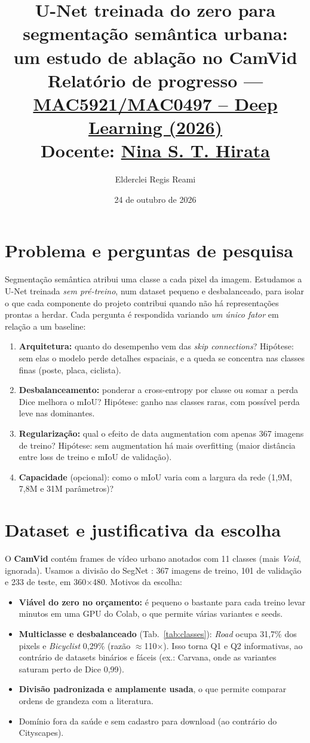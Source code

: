 \documentclass[10pt,a4paper,twocolumn]{article}
\title{\vspace{-1.2cm}\Large U-Net treinada do zero para segmentação semântica urbana:\\
um estudo de ablação no CamVid\\[2pt]
\normalsize Relatório de progresso ---
\href{https://edisciplinas.usp.br/course/view.php?id=143903}{MAC5921/MAC0497 -- Deep Learning (2026)}\\
\normalsize Docente: \href{https://edisciplinas.usp.br/user/view.php?id=288715&course=1}{Nina S. T. Hirata}}
\author{Elderclei Regis Reami}
\date{24 de outubro de 2026}
\begin{document}
\maketitle
\vspace{-0.8cm}

\section{Problema e perguntas de pesquisa}
Segmentação semântica atribui uma classe a cada pixel da imagem. Estudamos a U-Net
\cite{ronneberger} treinada \emph{sem pré-treino}, num dataset pequeno e desbalanceado,
para isolar o que cada componente do projeto contribui quando não há representações
prontas a herdar. Cada pergunta é respondida variando \emph{um único fator}
em relação a um baseline:
\begin{enumerate}
  \item[\textbf{Q1}] \textbf{Arquitetura:} quanto do desempenho vem das \emph{skip
  connections}? Hipótese: sem elas o modelo perde detalhes espaciais, e a queda se
  concentra nas classes finas (poste, placa, ciclista).
  \item[\textbf{Q2}] \textbf{Desbalanceamento:} ponderar a cross-entropy por classe ou
  somar a perda Dice \cite{milletari} melhora o mIoU? Hipótese: ganho nas classes raras,
  com possível perda leve nas dominantes.
  \item[\textbf{Q3}] \textbf{Regularização:} qual o efeito de data augmentation com
  apenas 367 imagens de treino? Hipótese: sem augmentation há mais overfitting
  (maior distância entre loss de treino e mIoU de validação).
  \item[\textbf{Q4}] \textbf{Capacidade} (opcional): como o mIoU varia com a largura
  da rede (1,9M, 7,8M e 31M parâmetros)?
\end{enumerate}

\section{Dataset e justificativa da escolha}
O \textbf{CamVid} \cite{camvid} contém frames de vídeo urbano anotados com 11 classes
(mais \emph{Void}, ignorada). Usamos a divisão do SegNet \cite{segnet}: 367 imagens de
treino, 101 de validação e 233 de teste, em 360$\times$480.
Motivos da escolha:
\begin{itemize}
  \item \textbf{Viável do zero no orçamento:} é pequeno o bastante para cada treino
  levar minutos em uma GPU do Colab, o que permite várias variantes e seeds.
  \item \textbf{Multiclasse e desbalanceado} (Tab.~\ref{tab:classes}): \emph{Road}
  ocupa 31,7\% dos pixels e \emph{Bicyclist} 0,29\% (razão $\approx$110$\times$).
  Isso torna Q1 e Q2 informativas, ao contrário de datasets binários e fáceis
  (ex.: Carvana, onde as variantes saturam perto de Dice 0,99).
  \item \textbf{Divisão padronizada e amplamente usada}, o que permite comparar
  ordens de grandeza com a literatura.
  \item Domínio fora da saúde e sem cadastro para download (ao contrário do Cityscapes).
\end{itemize}
\end{document}
